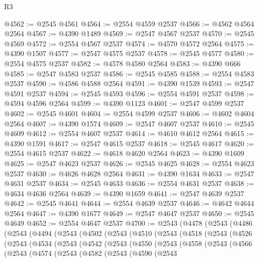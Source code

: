 \begin{lexlean}{R3}
\begin{coremodule}
@4562 := @2545 @4561
@4564 := @2554 @4559 @2537
@4566 := @4562 @4564 @2564
@4567 := @4390 @1489
@4569 := @2547 @4567 @2537
@4570 := @2545 @4569
@4572 := @2554 @4567 @2537
@4574 := @4570 @4572 @2564
@4575 := @4390 @1507
@4577 := @2547 @4575 @2537
@4578 := @2545 @4577
@4580 := @2554 @4575 @2537
@4582 := @4578 @4580 @2564
@4583 := @4390 @666
@4585 := @2547 @4583 @2537
@4586 := @2545 @4585
@4588 := @2554 @4583 @2537
@4590 := @4586 @4588 @2564
@4591 := @4390 @1539
@4593 := @2547 @4591 @2537
@4594 := @2545 @4593
@4596 := @2554 @4591 @2537
@4598 := @4594 @4596 @2564
@4599 := @4390 @1123
@4601 := @2547 @4599 @2537
@4602 := @2545 @4601
@4604 := @2554 @4599 @2537
@4606 := @4602 @4604 @2564
@4607 := @4390 @1574
@4609 := @2547 @4607 @2537
@4610 := @2545 @4609
@4612 := @2554 @4607 @2537
@4614 := @4610 @4612 @2564
@4615 := @4390 @1591
@4617 := @2547 @4615 @2537
@4618 := @2545 @4617
@4620 := @2554 @4615 @2537
@4622 := @4618 @4620 @2564
@4623 := @4390 @1609
@4625 := @2547 @4623 @2537
@4626 := @2545 @4625
@4628 := @2554 @4623 @2537
@4630 := @4626 @4628 @2564
@4631 := @4390 @1634
@4633 := @2547 @4631 @2537
@4634 := @2545 @4633
@4636 := @2554 @4631 @2537
@4638 := @4634 @4636 @2564
@4639 := @4390 @1659
@4641 := @2547 @4639 @2537
@4642 := @2545 @4641
@4644 := @2554 @4639 @2537
@4646 := @4642 @4644 @2564
@4647 := @4390 @1677
@4649 := @2547 @4647 @2537
@4650 := @2545 @4649
@4652 := @2554 @4647 @2537
@4700 := @2543
    (@4478
      (@2543
        (@4486
          (@2543
            (@4494
              (@2543
                (@4502
                  (@2543
                    (@4510
                      (@2543
                        (@4518
                          (@2543
                            (@4526
                              (@2543
                                (@4534
                                  (@2543
                                    (@4542
                                      (@2543
                                        (@4550
                                          (@2543
                                            (@4558
                                              (@2543
                                                (@4566
                                                  (@2543
                                                    (@4574
                                                      (@2543
                                                        (@4582
                                                          (@2543
                                                            (@4590
                                                              (@2543

\end{coremodule}
\end{lexlean}
